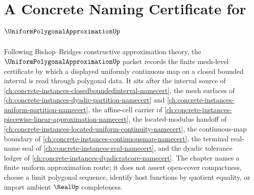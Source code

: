 \chapter{A Concrete Naming Certificate for $\UniformPolygonalApproximationUp$}
\label{ch:concrete-instances-uniform-polygonal-approximation-namecert}

Following Bishop--Bridges constructive approximation theory, the $\UniformPolygonalApproximationUp$ packet records the finite mesh-level certificate by which a displayed uniformly continuous map on a closed bounded interval is read through polygonal data. It sits after the interval source of \autoref{ch:concrete-instances-closedboundedinterval-namecert}, the mesh surfaces of \autoref{ch:concrete-instances-dyadic-partition-namecert} and \autoref{ch:concrete-instances-uniform-partition-namecert}, the affine-cell carrier of \autoref{ch:concrete-instances-piecewise-linear-approximation-namecert}, the located-modulus handoff of \autoref{ch:concrete-instances-located-uniform-continuity-namecert}, the continuous-map boundary of \autoref{ch:concrete-instances-continuousmap-namecert}, the terminal real-name seal of \autoref{ch:concrete-instances-real-namecert}, and the dyadic tolerance ledger of \autoref{ch:concrete-instances-dyadicratcore-namecert}. The chapter names a finite uniform approximation route; it does not assert open-cover compactness, choose a limit polygonal sequence, identify host functions by quotient equality, or import ambient $\RealUp$ completeness.

